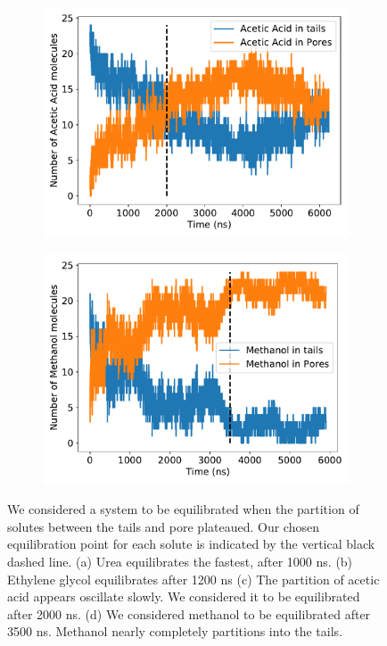 \documentclass{article}
\begin{document}
\begin{figure}[hb]
\begin{subfigure}{0.45\textwidth}
  \includegraphics[width=\textwidth]{ACH_equilibration.pdf}
  \caption{}\label{fig:ACH_equilibration}
  \end{subfigure}
  \begin{subfigure}{0.45\textwidth}
  \includegraphics[width=\textwidth]{MET_equilibration.pdf}
  \caption{}\label{fig:MET_equilibration}
  \end{subfigure}
  \caption{We considered a system to be equilibrated when the partition of solutes
  between the tails and pore plateaued. Our chosen equilibration point for each
  solute is indicated by the vertical black dashed line. (a) Urea equilibrates
  the fastest, after 1000 ns. (b) Ethylene glycol equilibrates after 1200 ns 
  (c) The partition of acetic acid appears oscillate slowly. We considered it to be
  equilibrated after 2000 ns. (d) We considered methanol to be equilibrated after
  3500 ns. Methanol nearly completely partitions into the tails.}\label{fig:equilibration}
  \end{figure}
\end{document}
